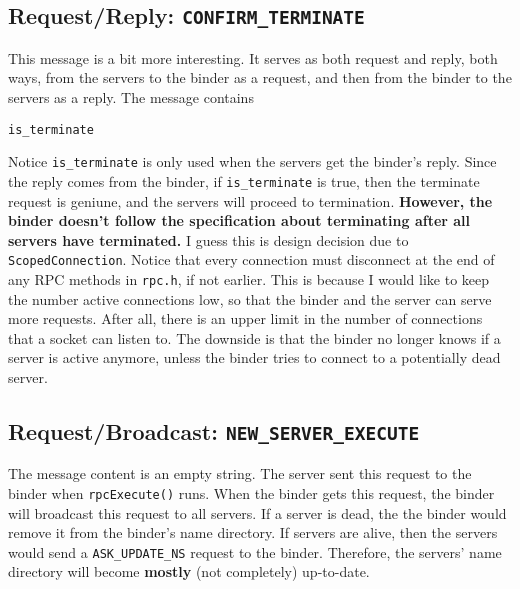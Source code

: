 \subsection{Request/Reply: \tt CONFIRM\_TERMINATE}
This message is a bit more interesting.
It serves as both request and reply, both ways, from the servers to the binder as a request, and then from the binder to the servers as a reply.
The message contains
\begin{verbatim}
is_terminate
\end{verbatim}
Notice {\tt is\_terminate} is only used when the servers get the binder's reply.
Since the reply comes from the binder, if {\tt is\_terminate} is true, then the terminate request is geniune, and the servers will proceed to termination.
{\bf However, the binder doesn't follow the specification about terminating after all servers have terminated.}
I guess this is design decision due to {\tt ScopedConnection}.
Notice that every connection must disconnect at the end of any RPC methods in {\tt rpc.h}, if not earlier.
This is because I would like to keep the number active connections low, so that the binder and the server can serve more requests.
After all, there is an upper limit in the number of connections that a socket can listen to.
The downside is that the binder no longer knows if a server is active anymore, unless the binder tries to connect to a potentially dead server.

\subsection{Request/Broadcast: \tt NEW\_SERVER\_EXECUTE}
The message content is an empty string.
The server sent this request to the binder when {\tt rpcExecute()} runs.
When the binder gets this request, the binder will broadcast this request to all servers.
If a server is dead, the the binder would remove it from the binder's name directory.
If servers are alive, then the servers would send a {\tt ASK\_UPDATE\_NS} request to the binder.
Therefore, the servers' name directory will become {\bf mostly} (not completely) up-to-date.
